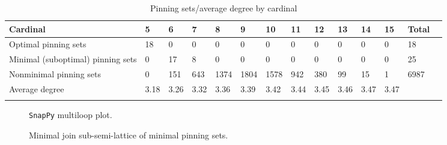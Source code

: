 \documentclass{article}%
\begin{document}
\begin{table}[ht]
	\caption{Pinning sets/average degree by cardinal}
	\centering
	\renewcommand{\arraystretch}{1.5}
	\begin{tabularx}{\textwidth}{lXXXXXXXXXXXXX}
		\toprule
			Cardinal & 5 & 6 & 7 & 8 & 9 & 10 & 11 & 12 & 13 & 14 & 15 & Total\\
			\hline
			Optimal pinning sets & 18 & 0 & 0 & 0 & 0 & 0 & 0 & 0 & 0 & 0 & 0 & 18 \\
			Minimal (suboptimal) pinning sets & 0 & 17 & 8 & 0 & 0 & 0 & 0 & 0 & 0 & 0 & 0 & 25 \\
			Nonminimal pinning sets & 0 & 151 & 643 & 1374 & 1804 & 1578 & 942 & 380 & 99 & 15 & 1 & 6987 \\
			Average degree & 3.18 & 3.26 & 3.32 & 3.36 & 3.39 & 3.42 & 3.44 & 3.45 & 3.46 & 3.47 & 3.47 &  \\
		\bottomrule \\ 
	\end{tabularx}
\end{table}

\begin{multicols}{2}
\begin{figure}[H]
\centering

\caption{\texttt{SnapPy} multiloop plot.}
\label{fig:tex/img/[[16, 7, 1, 8], [8, 17, 9, 26], [15, 25, 16, 26], [6, 24, 7, 25], [1, 24, 2, 23], [17, 23, 18, 22], [9, 14, 10, 15], [10, 5, 11, 6], [2, 19, 3, 18], [13, 21, 14, 22], [4, 20, 5, 21], [11, 20, 12, 19],.svg}
\end{figure}
\columnbreak

\begin{figure}[H]
\centering
\scalebox{0.8}{}
\caption{Minimal join sub-semi-lattice of minimal pinning sets.}
\label{fig:tex/img/[[16, 7, 1, 8], [8, 17, 9, 26], [15, 25, 16, 26], [6, 24, 7, 25], [1, 24, 2, 23], [17, 23, 18, 22], [9, 14, 10, 15], [10, 5, 11, 6], [2, 19, 3, 18], [13, 21, 14, 22], [4, 20, 5, 21], [11, 20, 12, 19],.pgf}
\end{figure}
\end{multicols}
\end{document}
